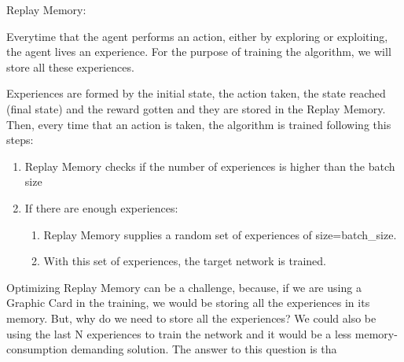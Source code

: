 Replay Memory:

  Everytime that the agent performs an action, either by exploring or exploiting, the agent lives an experience. For the purpose of training the algorithm, we will store all these experiences.

  Experiences are formed by the initial state, the action taken, the state reached (final state) and the reward gotten and they are stored in the Replay Memory. Then, every time that an action is taken, the algorithm is trained following this steps:

  \begin{enumerate}
    \item Replay Memory checks if the number of experiences is higher than the batch size
    \item If there are enough experiences:
    \begin{enumerate}
      \item Replay Memory supplies a random set of experiences of size=batch_size.
      \item With this set of experiences, the target network is trained.
    \end{enumerate}
  \end{enumerate}

  Optimizing Replay Memory can be a challenge, because, if we are using a Graphic Card in the training, we would be storing all the experiences in its memory. But, why do we need to store all the experiences? We could also be using the last N experiences to train the network and it would be a less memory-consumption demanding solution. The answer to this question is tha
  
